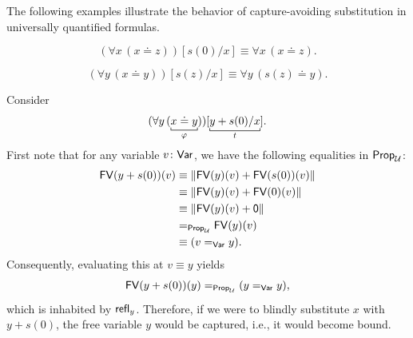 \begin{xmpl}
    The following examples illustrate the behavior of capture-avoiding substitution in universally quantified formulas.

    \begin{description}[font=\normalfont\scshape]
        \item[Case 1: $x\eq{\fun{Var}}y$.]
        \[
            (\forall x\,(x\doteq z))[s(0)/x]
                \equiv\forall x\,(x\doteq z).
        \]
        
        \item[Case 2: $\neg(x\eq{\fun{Var}}y)$ and $\neg\fun{FV}(t)(y)$.]
        \[
            (\forall y\,(x\doteq y))[s(z)/x]
                \equiv\forall y\,(s(z)\doteq y).
        \]
        
        \item[Case 3: $\neg(x\eq{\fun{Var}}y)$ and $\fun{FV}(t)(y)$.] Consider
        \[
            (\forall y\,(\explain[\varphi]{x\doteq y}))[\explain[t]{y+s(0)/x}].
        \]
        First note that for any variable $v\colon\fun{Var}$, we have the following equalities in $\mathsf{Prop}_\mathcal U$:
        \begin{align*}
            \mathsf{FV}(y+s(0))(v)
                &\equiv\lVert\mathsf{FV}(y)(v)+\mathsf{FV}(s(0))(v)\rVert\\
                &\equiv\lVert\mathsf{FV}(y)(v)+\mathsf{FV}(0)(v)\rVert\\
                &\equiv\lVert\mathsf{FV}(y)(v)+\mathsf{0}\rVert\\
                &\mathrel{=_{\mathsf{Prop}_\mathcal U}}\mathsf{FV}(y)(v)\\
                &\equiv(v\mathrel{=_{\mathsf{Var}}}y).
        \end{align*}
        Consequently, evaluating this at $v\equiv y$ yields
        \[
            \mathsf{FV}(y+s(0))(y)
                \mathrel{=_{\mathsf{Prop}_\mathcal U}}
                (y\mathrel{=_{\mathsf{Var}}}y),
        \]
        which is inhabited by $\mathsf{refl}_y$. Therefore, if we were to blindly substitute $x$ with $y+s(0)$, the free variable $y$ would be captured, i.e., it would become bound.


\end{description}
\end{xmpl}
